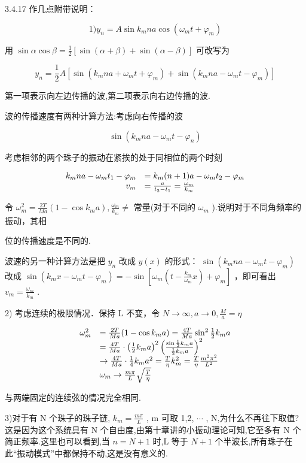 \begin{problem}{3.4.17}
作几点附带说明：

\[
1) y _ {n} = A \sin k _ {m} n a \cos (\omega_ {m} t + \varphi_ {m})
\]

用 $\sin \alpha \cos \beta = \frac{1}{2} [\sin (\alpha +\beta) + \sin (\alpha -\beta)]$ 可改写为

\[
y _ {n} = \frac {1}{2} A \left[ \sin \left(k _ {m} n a + \omega_ {m} t + \varphi_ {m}\right) + \sin \left(k _ {m} n a - \omega_ {m} t - \varphi_ {m}\right) \right]
\]

第一项表示向左边传播的波,第二项表示向右边传播的波.

波的传播速度有两种计算方法:考虑向右传播的波

\[
\sin (k _ {m} n a - \omega_ {m} t - \varphi_ {n})
\]

考虑相邻的两个珠子的振动在紧挨的处于同相位的两个时刻

\[
\begin{array}{r l} k _ {m} n a - \omega_ {m} t _ {1} - \varphi_ {m} & = k _ {m} (n + 1) a - \omega_ {m} t _ {2} - \varphi_ {m} \\ v _ {m} & = \frac {a}{t _ {2} - t _ {1}} = \frac {\omega_ {m}}{k _ {m}} \end{array}
\]

令 $\omega_{m}^{2} = \frac{2T}{Ma} (1 - \cos k_{m}a),\frac{\omega_{m}}{k_{m}}\neq$ 常量(对于不同的 $\omega_{m}$ ).说明对于不同角频率的振动，其相

位的传播速度是不同的.

波速的另一种计算方法是把 $y_{n}$ 改成 $y(x)$ 的形式： $\sin (k_m n a - \omega_m t - \varphi_m)$ 改成 $\sin (k_m x - \omega_m t - \varphi_m) = -\sin \left[\omega_m \left(t - \frac{k_m}{\omega_m} x\right) + \varphi_m\right]$ ，即可看出 $v_m = \frac{\omega_m}{k_m}$ .

2) 考虑连续的极限情况．保持 L 不变，令 $N \to \infty, a \to 0, \frac{M}{a} = \eta$ 

\[
\begin{array}{r l}\omega_ {m} ^ {2}&= \frac {2 T}{M a} (1 - \cos k _ {m} a) = \frac {4 T}{M a} \sin^ {2} \frac {1}{2} k _ {m} a\\&= \frac {4 T}{M a} \cdot \left(\frac {1}{2} k _ {m} a\right) ^ {2} \left(\frac {\sin \frac {1}{2} k _ {m} a}{\frac {1}{2} k _ {m} a}\right) ^ {2}\\&\rightarrow \frac {4 T}{M a} \cdot \frac {1}{4} k _ {m} a ^ {2} = \frac {T}{\eta} k _ {m} ^ {2} = \frac {T}{\eta} \frac {m ^ {2} \pi^ {2}}{L ^ {2}}\\&\omega_ {m} \rightarrow \frac {m \pi}{L} \sqrt {\frac {T}{\eta}}\end{array}
\]

与两端固定的连续弦的情况完全相同.

3)对于有 N 个珠子的珠子链, $k_{m}=\frac{m\pi}{L}$ , m 可取 1,2, $\cdots$ , N,为什么不再往下取值? 这是因为这个系统具有 N 个自由度,由第十章讲的小振动理论可知,它至多有 N 个简正频率.这里也可以看到,当 $n=N+1$ 时,L 等于 $N+1$ 个半波长,所有珠子在此“振动模式”中都保持不动,这是没有意义的.
\begin{center}

\end{center}
\end{problem}
\clearpage


